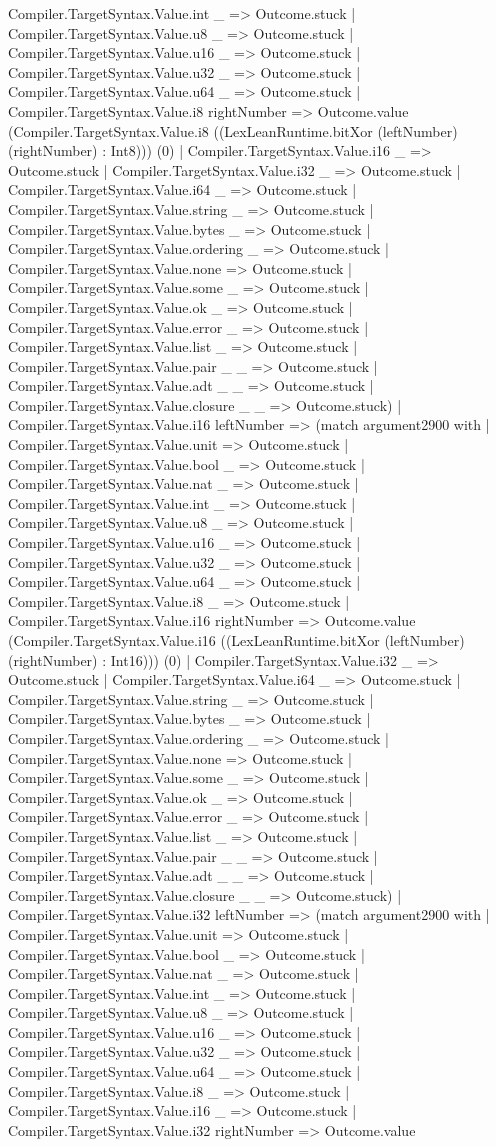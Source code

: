 \documentclass[11pt]{article}
\begin{document}
Compiler.TargetSyntax.Value.int \_ => Outcome.stuck | Compiler.TargetSyntax.Value.u8 \_ => Outcome.stuck | Compiler.TargetSyntax.Value.u16 \_ => Outcome.stuck | Compiler.TargetSyntax.Value.u32 \_ => Outcome.stuck | Compiler.TargetSyntax.Value.u64 \_ => Outcome.stuck | Compiler.TargetSyntax.Value.i8 rightNumber => Outcome.value (Compiler.TargetSyntax.Value.i8 ((LexLeanRuntime.bitXor (leftNumber) (rightNumber) : Int8))) (0) | Compiler.TargetSyntax.Value.i16 \_ => Outcome.stuck | Compiler.TargetSyntax.Value.i32 \_ => Outcome.stuck | Compiler.TargetSyntax.Value.i64 \_ => Outcome.stuck | Compiler.TargetSyntax.Value.string \_ => Outcome.stuck | Compiler.TargetSyntax.Value.bytes \_ => Outcome.stuck | Compiler.TargetSyntax.Value.ordering \_ => Outcome.stuck | Compiler.TargetSyntax.Value.none => Outcome.stuck | Compiler.TargetSyntax.Value.some \_ => Outcome.stuck | Compiler.TargetSyntax.Value.ok \_ => Outcome.stuck | Compiler.TargetSyntax.Value.error \_ => Outcome.stuck | Compiler.TargetSyntax.Value.list \_ => Outcome.stuck | Compiler.TargetSyntax.Value.pair \_ \_ => Outcome.stuck | Compiler.TargetSyntax.Value.adt \_ \_ => Outcome.stuck | Compiler.TargetSyntax.Value.closure \_ \_ => Outcome.stuck) | Compiler.TargetSyntax.Value.i16 leftNumber => (match argument2900 with | Compiler.TargetSyntax.Value.unit => Outcome.stuck | Compiler.TargetSyntax.Value.bool \_ => Outcome.stuck | Compiler.TargetSyntax.Value.nat \_ => Outcome.stuck | Compiler.TargetSyntax.Value.int \_ => Outcome.stuck | Compiler.TargetSyntax.Value.u8 \_ => Outcome.stuck | Compiler.TargetSyntax.Value.u16 \_ => Outcome.stuck | Compiler.TargetSyntax.Value.u32 \_ => Outcome.stuck | Compiler.TargetSyntax.Value.u64 \_ => Outcome.stuck | Compiler.TargetSyntax.Value.i8 \_ => Outcome.stuck | Compiler.TargetSyntax.Value.i16 rightNumber => Outcome.value (Compiler.TargetSyntax.Value.i16 ((LexLeanRuntime.bitXor (leftNumber) (rightNumber) : Int16))) (0) | Compiler.TargetSyntax.Value.i32 \_ => Outcome.stuck | Compiler.TargetSyntax.Value.i64 \_ => Outcome.stuck | Compiler.TargetSyntax.Value.string \_ => Outcome.stuck | Compiler.TargetSyntax.Value.bytes \_ => Outcome.stuck | Compiler.TargetSyntax.Value.ordering \_ => Outcome.stuck | Compiler.TargetSyntax.Value.none => Outcome.stuck | Compiler.TargetSyntax.Value.some \_ => Outcome.stuck | Compiler.TargetSyntax.Value.ok \_ => Outcome.stuck | Compiler.TargetSyntax.Value.error \_ => Outcome.stuck | Compiler.TargetSyntax.Value.list \_ => Outcome.stuck | Compiler.TargetSyntax.Value.pair \_ \_ => Outcome.stuck | Compiler.TargetSyntax.Value.adt \_ \_ => Outcome.stuck | Compiler.TargetSyntax.Value.closure \_ \_ => Outcome.stuck) | Compiler.TargetSyntax.Value.i32 leftNumber => (match argument2900 with | Compiler.TargetSyntax.Value.unit => Outcome.stuck | Compiler.TargetSyntax.Value.bool \_ => Outcome.stuck | Compiler.TargetSyntax.Value.nat \_ => Outcome.stuck | Compiler.TargetSyntax.Value.int \_ => Outcome.stuck | Compiler.TargetSyntax.Value.u8 \_ => Outcome.stuck | Compiler.TargetSyntax.Value.u16 \_ => Outcome.stuck | Compiler.TargetSyntax.Value.u32 \_ => Outcome.stuck | Compiler.TargetSyntax.Value.u64 \_ => Outcome.stuck | Compiler.TargetSyntax.Value.i8 \_ => Outcome.stuck | Compiler.TargetSyntax.Value.i16 \_ => Outcome.stuck | Compiler.TargetSyntax.Value.i32 rightNumber => Outcome.value 
\end{document}
